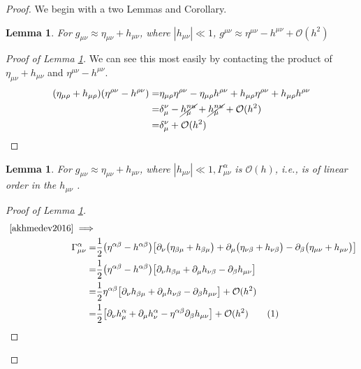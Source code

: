 \documentclass[]{article}
\newtheorem{lemma}[theorem]{Lemma}
\newcommand\numberthis{\addtocounter{equation}{1}\tag{\theequation}}
\begin{document}
\begin{proof}
	We begin with a two Lemmas and Corollary.
	\begin{lemma}\label{lemma:raise-indices}
			For $g_{\mu\nu} \approx \eta_{\mu\nu} + h_{\mu\nu}$, where $|h_{\mu\nu}| \ll 1$,  $g^{\mu\nu} \approx \eta^{\mu\nu} - h^{\mu\nu} + \mathcal{O}(h^2)$
	\end{lemma}
	\begin{proof}[Proof of Lemma \ref{lemma:raise-indices}]
		We can see this most easily by contacting the product of $\eta_{\mu\nu} + h_{\mu\nu}$ and $\eta^{\mu\nu} - h^{\mu\nu}$.
		\begin{align*}
		(\eta_{\mu\rho} + h_{\mu\rho})(\eta^{\rho\nu} - h^{\rho\nu})=&\eta_{\mu\rho}\eta^{\rho\nu} -\eta_{\mu\rho}h^{\rho\nu} + h_{\mu\rho}\eta^{\rho\nu} + h_{\mu\rho}h^{\rho\nu}\\
		=& \delta_{\mu}^{\nu} - \cancel{h_{\mu}^{nu}} +\cancel{ h_{\mu}^{nu}} + \mathcal{O}(h^2)\\
		=& \delta_{\mu}^{\nu}  + \mathcal{O}(h^2)
		\end{align*}
	\end{proof}
	\begin{lemma}\label{lemma:gamma}
		For $g_{\mu\nu} \approx \eta_{\mu\nu} + h_{\mu\nu}$, where $|h_{\mu\nu}| \ll 1,  \Gamma^{\alpha}_{\mu\nu}$ is $\mathcal{O}(h)$, i.e., is of linear order in the $h_{\mu\nu}$ .
	\end{lemma}
    \begin{proof}[Proof of Lemma \ref{lemma:gamma}]
    	\begin{align*}
    	\text{	\cite[(46)]{akhmedev2016}}\implies&\\
    	\Gamma^{\alpha}_{\mu\nu} =& \frac{1}{2} \big(\eta^{\alpha\beta}-h^{\alpha\beta}\big)\big[\partial_{\nu}\big(\eta_{\beta\mu}+h_{\beta\mu}\big)+\partial_{\mu}\big(\eta_{\nu\beta}+h_{\nu\beta}\big)-\partial_{\beta}\big(\eta_{\mu\nu}+h_{\mu\nu}\big)\big] \\
    	=& \frac{1}{2} \big(\eta^{\alpha\beta}-h^{\alpha\beta}\big)\big[\partial_{\nu}h_{\beta\mu}+\partial_{\mu}h_{\nu\beta}-\partial_{\beta}h_{\mu\nu}\big]\\
    	=& \frac{1}{2} \eta^{\alpha\beta}\big[\partial_{\nu}h_{\beta\mu}+\partial_{\mu}h_{\nu\beta}-\partial_{\beta}h_{\mu\nu}\big] + \mathcal{O}(h^2)\\
    	=& \frac{1}{2} \big[\partial_{\nu}h^{\alpha}_{\mu}+\partial_{\mu}h^{\alpha}_{\nu}-\eta^{\alpha\beta}\partial_{\beta}h_{\mu\nu}\big] + \mathcal{O}(h^2) \numberthis\label{eq:Gamma} \\

\end{align*}
\end{proof}
\end{proof}
\end{document}
